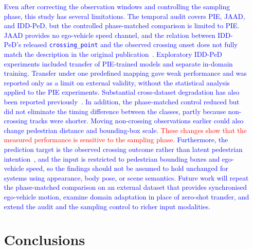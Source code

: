 \documentclass[mti,article,submit,moreauthors]{Definitions/mdpi}
\begin{document}
\textcolor{blue}{Even after correcting the observation windows and controlling the sampling phase, this study has several limitations. The temporal audit covers PIE, JAAD, and IDD-PeD, but the controlled phase-matched comparison is limited to PIE. JAAD provides no ego-vehicle speed channel, and the relation between IDD-PeD's released \texttt{crossing\_point} and the observed crossing onset does not fully match the description in the original publication~\citep{bokkasam2025iddped}. Exploratory IDD-PeD experiments included transfer of PIE-trained models and separate in-domain training. Transfer under one predefined mapping gave weak performance and was reported only as a limit on external validity, without the statistical analysis applied to the PIE experiments. Substantial cross-dataset degradation has also been reported previously~\citep{gesnouin2022assessing}. In addition, the phase-matched control reduced but did not eliminate the timing difference between the classes, partly because non-crossing tracks were shorter. Moving non-crossing observations earlier could also change pedestrian distance and bounding-box scale. \textcolor{red}{These changes show that the measured performance is sensitive to the sampling phase.} Furthermore, the prediction target is the observed crossing outcome rather than latent pedestrian intention~\citep{rasouli2024diving}, and the input is restricted to pedestrian bounding boxes and ego-vehicle speed, so the findings should not be assumed to hold unchanged for systems using appearance, body pose, or scene semantics. Future work will repeat the phase-matched comparison on an external dataset that provides synchronised ego-vehicle motion, examine domain adaptation in place of zero-shot transfer, and extend the audit and the sampling control to richer input modalities.}


\section{Conclusions}\label{sec:conclusions}
\end{document}
